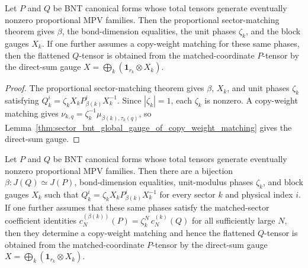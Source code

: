 \begin{lemma}%
    \label{thm:sector_bnt_proportional_global_gauge_of_copy_weight_matching}
    \leanok
    Let $P$ and $Q$ be BNT canonical forms whose total tensors generate
    eventually nonzero proportional MPV families.
    Then the proportional sector-matching theorem gives $\beta$, the
    bond-dimension equalities, the unit phases $\zeta_k$, and the block gauges
    $X_k$. If one further assumes a copy-weight matching for these same phases, then the flattened
    $Q$-tensor is obtained from the matched-coordinate $P$-tensor by the
    direct-sum gauge $X=\bigoplus_k(\mathbf{1}_{r_k}\otimes X_k)$.
\end{lemma}

\begin{proof}\leanok
    The proportional sector-matching theorem gives $\beta$, $X_k$, and
    unit phases $\zeta_k$ satisfying
    $Q_k^i=\zeta_kX_kP_{\beta(k)}^iX_k^{-1}$. Since $|\zeta_k|=1$, each
    $\zeta_k$ is nonzero. A copy-weight matching gives
    $\nu_{k,q}=\zeta_k^{-1}\mu_{\beta(k),\tau_k(q)}$, so
    Lemma~\ref{thm:sector_bnt_global_gauge_of_copy_weight_matching} gives the
    direct-sum gauge.
\end{proof}

\begin{lemma}%
    \label{thm:sector_bnt_proportional_global_gauge_of_coeff_identity}
    \leanok
    Let $P$ and $Q$ be BNT canonical forms whose total tensors generate
    eventually nonzero proportional MPV families.
    Then there are a bijection $\beta:J(Q)\simeq J(P)$, bond-dimension
    equalities, unit-modulus phases $\zeta_k$, and block gauges $X_k$ such that
    $Q_k^i=\zeta_k X_kP_{\beta(k)}^iX_k^{-1}$ for every sector $k$ and physical
    index $i$. If one further assumes that these same phases satisfy the matched-sector coefficient
    identities $c_N^{(\beta(k))}(P)=\zeta_k^N\,c_N^{(k)}(Q)$ for all
    sufficiently large $N$, then they determine a copy-weight matching and
    hence the flattened $Q$-tensor is obtained from the matched-coordinate
    $P$-tensor by the direct-sum gauge
    $X=\bigoplus_k(\mathbf{1}_{r_k}\otimes X_k)$.
\end{lemma}

